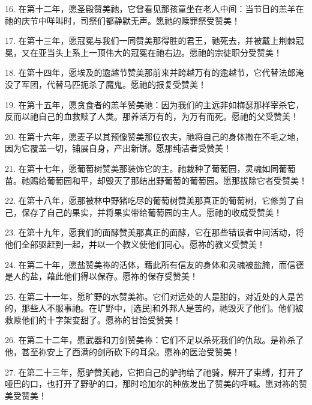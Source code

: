 16. 在第十二年，愿圣殿赞美祂，它曾看见那孩童坐在老人中间：当节日的羔羊在祂的庆节中咩叫时，司祭们都静默无声。愿祂的赎罪祭受赞美！\par

17. 在第十三年，愿冠冕与我们一同赞美那得胜的君王，祂死去，并被戴上荆棘冠冕，又在亚当头上系上一顶伟大的冠冕在祂右边。愿祂的宗徒职分受赞美！\par

18. 在第十四年，愿埃及的逾越节赞美那前来并跨越万有的逾越节，它代替法郎淹没了军团，代替马匹扼杀了魔鬼。愿祂的报复受赞美！\par

19. 在第十五年，愿贪食者的羔羊赞美祂：因为我们的主远非如梅瑟那样宰杀它，反而以祂自己的血救赎了人类。那养活万有的，为万有而死。愿祂的父受赞美！\par

20. 在第十六年，愿麦子以其预像赞美那位农夫，祂将自己的身体撒在不毛之地，因为它覆盖一切，铺展自身，产出新饼。愿那纯洁者受赞美！\par

21. 在第十七年，愿葡萄树赞美那装饰它的主。祂栽种了葡萄园，灵魂如同葡萄苗。祂赐给葡萄园和平，却毁灭了那结出野葡萄的葡萄园。愿那拔除它者受赞美！\par

22. 在第十八年，愿那被林中野猪吃尽的葡萄树赞美那真正的葡萄树，它修剪了自己，保存了自己的果实，并将果实带给葡萄园的主人。愿祂的收成受赞美！\par

23. 在第十九年，愿我们的面酵赞美那真正的面酵，它在那些错误者中间活动，将他们全部驱赶到一起，并以一个教义使他们同心。愿祢的教义受赞美！\par

24. 在第二十年，愿盐赞美祢的活体，藉此所有信友的身体和灵魂被盐腌，而信德是人的盐，藉此他们得以保存。愿祢的保存受赞美！\par

25. 在第二十一年，愿旷野的水赞美祢。它们对远处的人是甜的，对近处的人是苦的，那些人不服事祂。在旷野中，[选民]和外邦人是苦的，祂毁灭了他们。他们被救赎他们的十字架变甜了。愿祢的甘饴受赞美！\par

26. 在第二十二年，愿武器和刀剑赞美祢：它们不足以杀死我们的仇敌。是祢杀了他，甚至祢安上了西满的剑所砍下的耳朵。愿祢的医治受赞美！\par

27. 在第二十三年，愿驴赞美祂，它把自己的驴驹给了祂骑，解开了束缚，打开了哑巴的口，也打开了野驴的口，那时哈加尔的种族发出了赞美的呼喊。愿对祢的赞美受赞美！\par

